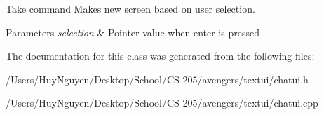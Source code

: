 Take command Makes new screen based on user selection. 


\begin{DoxyParams}{Parameters}
{\em selection} & Pointer value when enter is pressed \\
\hline
\end{DoxyParams}


The documentation for this class was generated from the following files\+:\begin{DoxyCompactItemize}
\item 
/\+Users/\+Huy\+Nguyen/\+Desktop/\+School/\+C\+S 205/avengers/textui/chatui.\+h\item 
/\+Users/\+Huy\+Nguyen/\+Desktop/\+School/\+C\+S 205/avengers/textui/chatui.\+cpp\end{DoxyCompactItemize}
